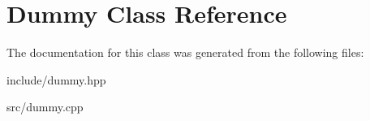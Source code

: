\hypertarget{class_dummy}{}\section{Dummy Class Reference}
\label{class_dummy}


The documentation for this class was generated from the following files\+:\begin{DoxyCompactItemize}
\item 
include/dummy.\+hpp\item 
src/dummy.\+cpp\end{DoxyCompactItemize}
